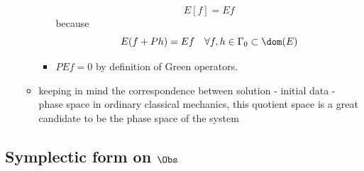 \documentclass[a4paper,11pt]{scrartcl}
\begin{document}
\begin{enumerate}
\begin{itemize}
\begin{itemize}
                    $$ E[f] =  E f $$
                    because
                    $$ E(f + P h ) = E f  \quad \forall f,h \in \Gamma_0 \subset \dom(E)$$
                    \item $ P E f = 0 $ by definition of Green operators.
                \end{itemize}
                \item keeping in mind the correspondence between solution  - initial data  - phase space in ordinary classical mechanics,
                this quotient space is a great candidate  to be the phase space of the system
            \end{itemize}
    \end{enumerate}
    \subsection{Symplectic form on $\Obs$}
\end{document}
